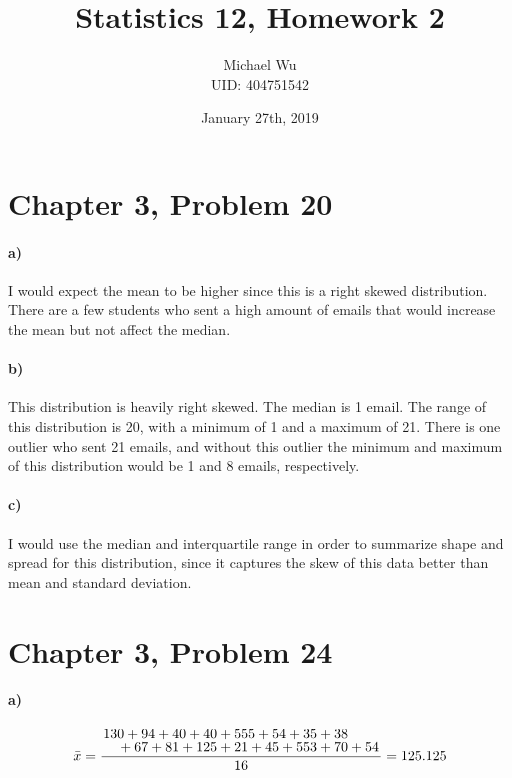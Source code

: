 \documentclass[12pt]{article}
\begin{document}
\title{Statistics 12, Homework 2}
\date{January 27th, 2019}
\author{Michael Wu\\UID: 404751542}
\maketitle

\section*{Chapter 3, Problem 20}

\paragraph{a)}

I would expect the mean to be higher since this is a right skewed distribution. There are a few
students who sent a high amount of emails that would increase the mean but not affect the median.

\paragraph{b)}

This distribution is heavily right skewed. The median is 1 email. The range of this distribution is 20,
with a minimum of 1 and a maximum of 21. There is one outlier who sent 21 emails, and without this
outlier the minimum and maximum of this distribution would be 1 and 8 emails, respectively.

\paragraph{c)}

I would use the median and interquartile range in order to summarize shape and spread for this
distribution, since it captures the skew of this data better than mean and standard deviation.

\section*{Chapter 3, Problem 24}

\paragraph{a)}

\[\bar{x} = \frac{\splitfrac{130+94+40+40+555+54+35+38}{+67+81+125+21+45+553+70+54}}{16}=125.125\]
\end{document}
